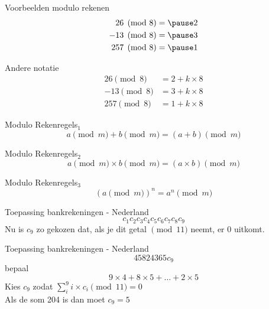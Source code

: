 \documentclass{beamer}
\begin{document}
\begin{frame}{Voorbeelden modulo rekenen}
	\begin{eqnarray}
			26  \pmod{8} &= \pause 2 \\
			-13 \pmod{8} &= \pause 3 \\
			257 \pmod{8} &= \pause 1 
	\end{eqnarray}
\end{frame}

\begin{frame}{Andere notatie}
	\begin{eqnarray}
	26  \pmod{8} &=  2 + k \times 8 \\
	-13 \pmod{8} &= 3 + k \times 8\\
	257 \pmod{8} &=  1 + k \times 8
	\end{eqnarray}
\end{frame}

\begin{frame}{Modulo Rekenregels$_1$}
	\[ a \pmod{m} + b \pmod{m}  =  (a + b)  \pmod{m}\]
\end{frame}

\begin{frame}{Modulo Rekenregels$_2$}
	\[ a \pmod{m} \times b \pmod{m}  =  (a \times b)  \pmod{m}\]
\end{frame}

\begin{frame}{Modulo Rekenregels$_3$}
	\[ (a \pmod{m})^n  =  a^n  \pmod{m}\]
\end{frame}

\begin{frame}{Toepassing bankrekeningen - Nederland}
	\[ c_1c_2c_3c_4c_5c_6c_7c_8c_9\]
	Nu is $c_9$ zo gekozen dat, als je dit getal  $\pmod{11}$ neemt, er 0 uitkomt.
	
\end{frame}

\begin{frame}{Toepassing bankrekeningen - Nederland}
	\[ 45824365c_9\]
	bepaal
	\[ 9 \times 4 + 8 \times 5 + \dots + 2 \times 5 \]
	Kies $c_9$ zodat $\sum_i^9  i \times c_i \pmod{11} = 0$ \\
	Als de som 204 is dan moet $c_9 = 5$ 
	
\end{frame}




\end{document}
